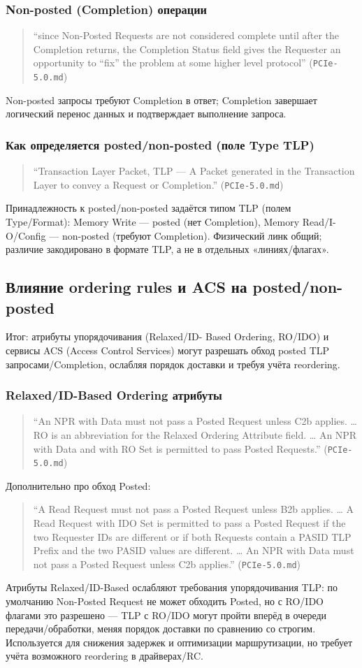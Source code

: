 \documentclass[a4paper,12pt]{article}
\begin{document}
\subsubsection{Non-posted (Completion) операции}
\begin{quote}
``since Non-Posted Requests are not considered complete until after the Completion returns, the Completion Status field gives the Requester an opportunity to “fix” the problem at some higher level protocol'' (\texttt{PCIe-5.0.md})
\end{quote}
Non-posted запросы требуют Completion в ответ; Completion завершает логический перенос данных и подтверждает выполнение запроса.
\subsubsection{Как определяется posted/non-posted (поле Type TLP)}
\begin{quote}
``Transaction Layer Packet, TLP — A Packet generated in the Transaction Layer to convey a Request or Completion.'' (\texttt{PCIe-5.0.md})
\end{quote}
Принадлежность к posted/non-posted задаётся типом TLP (полем Type/Format): Memory Write — posted (нет Completion), Memory Read/I-O/Config — non-posted (требуют Completion). Физический линк общий; различие закодировано в формате TLP, а не в отдельных «линиях/флагах».
\subsection{Влияние ordering rules и ACS на posted/non-posted}
Итог:  атрибуты упорядочивания (Relaxed/ID-
Based Ordering, RO/IDO) и сервисы ACS (Access Control Services) могут разрешать обход posted TLP запросами/Completion, ослабляя порядок доставки и требуя учёта reordering.
\subsubsection{Relaxed/ID-Based Ordering атрибуты}
\begin{quote}
``An NPR with Data must not pass a Posted Request unless C2b applies. … RO is an abbreviation for the Relaxed Ordering Attribute field. … An NPR with Data and with RO Set is permitted to pass Posted Requests.'' (\texttt{PCIe-5.0.md})
\end{quote}
Дополнительно про обход Posted:
\begin{quote}
``A Read Request must not pass a Posted Request unless B2b applies. … A Read Request with IDO Set is permitted to pass a Posted Request if the two Requester IDs are different or if both Requests contain a PASID TLP Prefix and the two PASID values are different. … An NPR with Data must not pass a Posted Request unless C2b applies.'' (\texttt{PCIe-5.0.md})
\end{quote}
Атрибуты Relaxed/ID-Based ослабляют требования упорядочивания TLP: по умолчанию Non-Posted Request не может обходить Posted, но с RO/IDO флагами это разрешено — TLP с RO/IDO могут пройти вперёд в очереди передачи/обработки, меняя порядок доставки по сравнению со строгим. Используется для снижения задержек и оптимизации маршрутизации, но требует учёта возможного reordering в драйверах/RC.
\end{document}
